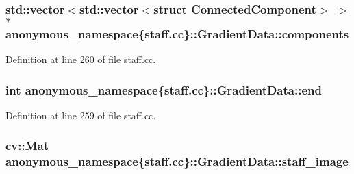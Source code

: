 \subsubsection[{\texorpdfstring{components}{components}}]{\setlength{\rightskip}{0pt plus 5cm}std\+::vector$<$std\+::vector$<$struct {\bf Connected\+Component}$>$ $>$$\ast$ anonymous\+\_\+namespace\{staff.\+cc\}\+::Gradient\+Data\+::components}\hypertarget{structanonymous__namespace_02staff_8cc_03_1_1GradientData_ab8ff0d4a7fdbeb1f29340e160eb617ca}{}\label{structanonymous__namespace_02staff_8cc_03_1_1GradientData_ab8ff0d4a7fdbeb1f29340e160eb617ca}


Definition at line 260 of file staff.\+cc.

\subsubsection[{\texorpdfstring{end}{end}}]{\setlength{\rightskip}{0pt plus 5cm}int anonymous\+\_\+namespace\{staff.\+cc\}\+::Gradient\+Data\+::end}\hypertarget{structanonymous__namespace_02staff_8cc_03_1_1GradientData_ac4f2494fcfceeb929511dd9dd28c16f6}{}\label{structanonymous__namespace_02staff_8cc_03_1_1GradientData_ac4f2494fcfceeb929511dd9dd28c16f6}


Definition at line 259 of file staff.\+cc.

\subsubsection[{\texorpdfstring{staff\+\_\+image}{staff_image}}]{\setlength{\rightskip}{0pt plus 5cm}cv\+::\+Mat anonymous\+\_\+namespace\{staff.\+cc\}\+::Gradient\+Data\+::staff\+\_\+image}\hypertarget{structanonymous__namespace_02staff_8cc_03_1_1GradientData_a782e4d21b7e1cd9efce5424e371e7eb4}{}\label{structanonymous__namespace_02staff_8cc_03_1_1GradientData_a782e4d21b7e1cd9efce5424e371e7eb4}


